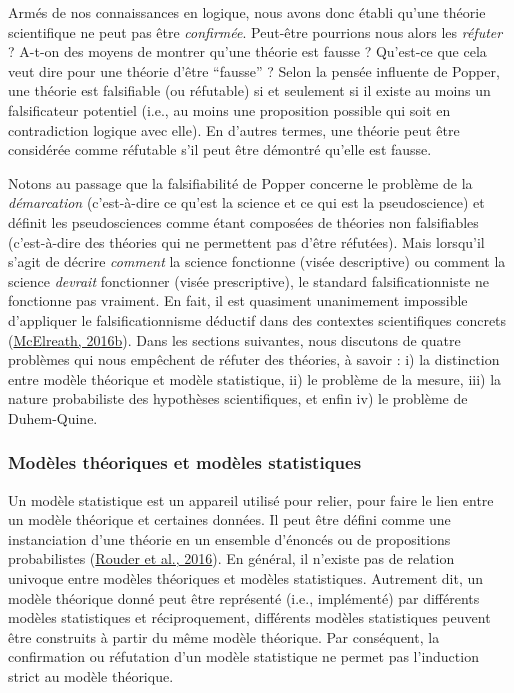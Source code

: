\documentclass[
  a4paper,11pt,twoside,onecolumn,openright,final,oldfontcommands]{memoir}
\theoremstyle{definition}
\theoremstyle{definition}
\theoremstyle{definition}
\theoremstyle{definition}
\theoremstyle{remark}
\begin{document}
Armés de nos connaissances en logique, nous avons donc établi qu'une théorie scientifique ne peut pas être \emph{confirmée}. Peut-être pourrions nous alors les \emph{réfuter} ? A-t-on des moyens de montrer qu'une théorie est fausse ? Qu'est-ce que cela veut dire pour une théorie d'être ``fausse'' ? Selon la pensée influente de Popper, une théorie est falsifiable (ou réfutable) si et seulement si il existe au moins un falsificateur potentiel (i.e., au moins une proposition possible qui soit en contradiction logique avec elle). En d'autres termes, une théorie peut être considérée comme réfutable s'il peut être démontré qu'elle est fausse.

Notons au passage que la falsifiabilité de Popper concerne le problème de la \emph{démarcation} (c'est-à-dire ce qu'est la science et ce qui est la pseudoscience) et définit les pseudosciences comme étant composées de théories non falsifiables (c'est-à-dire des théories qui ne permettent pas d'être réfutées). Mais lorsqu'il s'agit de décrire \emph{comment} la science fonctionne (visée descriptive) ou comment la science \emph{devrait} fonctionner (visée prescriptive), le standard falsificationniste ne fonctionne pas vraiment. En fait, il est quasiment unanimement impossible d'appliquer le falsificationnisme déductif dans des contextes scientifiques concrets (\protect\hyperlink{ref-mcelreath_statistical_2016}{McElreath, 2016b}). Dans les sections suivantes, nous discutons de quatre problèmes qui nous empêchent de réfuter des théories, à savoir : i) la distinction entre modèle théorique et modèle statistique, ii) le problème de la mesure, iii) la nature probabiliste des hypothèses scientifiques, et enfin iv) le problème de Duhem-Quine.

\hypertarget{moduxe8les-thuxe9oriques-et-moduxe8les-statistiques}{%
\subsubsection{Modèles théoriques et modèles statistiques}\label{moduxe8les-thuxe9oriques-et-moduxe8les-statistiques}}

Un modèle statistique est un appareil utilisé pour relier, pour faire le lien entre un modèle théorique et certaines données. Il peut être défini comme une instanciation d'une théorie en un ensemble d'énoncés ou de propositions probabilistes (\protect\hyperlink{ref-rouder_interplay_2016}{Rouder et al., 2016}). En général, il n'existe pas de relation univoque entre modèles théoriques et modèles statistiques. Autrement dit, un modèle théorique donné peut être représenté (i.e., implémenté) par différents modèles statistiques et réciproquement, différents modèles statistiques peuvent être construits à partir du même modèle théorique. Par conséquent, la confirmation ou réfutation d'un modèle statistique ne permet pas l'induction strict au modèle théorique.
\end{document}
